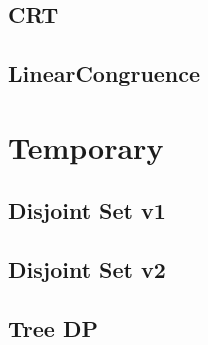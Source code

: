     \subsection{CRT}
        
    \subsection{LinearCongruence}
        


\section{Temporary}
    \subsection{Disjoint Set v1}
        
    \subsection{Disjoint Set v2}
        
    \subsection{Tree DP}
        